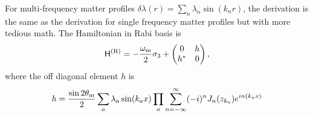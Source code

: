 For multi-frequency matter profiles $\delta \lambda(r) = \sum_n \lambda_n \sin (k_n r)$, the derivation is the same as the derivation for single frequency matter profiles but with more tedious math. The Hamiltonian in Rabi basis is
\begin{equation}
    \mathsf H^{(\mathrm R)} = -\frac{\omega_\mathrm m}{2}\sigma_3 + \begin{pmatrix}
        0 & h\\
        h^{*} & 0
        \end{pmatrix},
\end{equation}
where the off diagonal element $h$ is
\begin{equation}
    h = \frac{\sin 2\theta_\mathrm m}{2} \sum_a \lambda_a \sin (k_a x) \prod_{a} \sum_{n=-\infty}^{\infty} (-i)^n J_n (z_{k_a}) e^{i n(k_a x) }
\end{equation}

